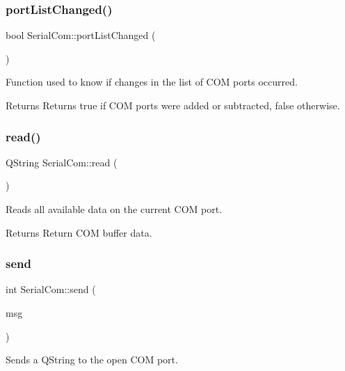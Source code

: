 \subsubsection{\texorpdfstring{port\+List\+Changed()}{portListChanged()}}
{\footnotesize\ttfamily bool Serial\+Com\+::port\+List\+Changed (\begin{DoxyParamCaption}{ }\end{DoxyParamCaption})}



Function used to know if changes in the list of C\+OM ports occurred. 

\begin{DoxyReturn}{Returns}
Returns true if C\+OM ports were added or subtracted, false otherwise. 
\end{DoxyReturn}
\mbox{\label{classSerialCom_ad601cc1e7675a979600a8f469fe2e611}} 
\subsubsection{\texorpdfstring{read()}{read()}}
{\footnotesize\ttfamily Q\+String Serial\+Com\+::read (\begin{DoxyParamCaption}{ }\end{DoxyParamCaption})}



Reads all available data on the current C\+OM port. 

\begin{DoxyReturn}{Returns}
Return C\+OM buffer data. 
\end{DoxyReturn}
\mbox{\label{classSerialCom_a7239ab9610d097a8f2dabfbb125eccc6}} 
\subsubsection{\texorpdfstring{send}{send}}
{\footnotesize\ttfamily int Serial\+Com\+::send (\begin{DoxyParamCaption}\item[{const Q\+String \&}]{msg }\end{DoxyParamCaption})\hspace{0.3cm}{\ttfamily [slot]}}



Sends a Q\+String to the open C\+OM port. 



